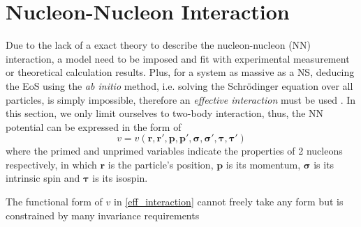 \section{Nucleon-Nucleon Interaction}%
\label{sec:nucleon_nucleon_interaction}

Due to the lack of a exact theory to describe the nucleon-nucleon (\gls{NN}) interaction, a model need to be imposed and fit with experimental measurement or theoretical calculation results. Plus, for a system as massive as a \gls{NS}, deducing the \gls{EoS} using the \emph{ab initio} method, i.e. solving the Schr\"{o}dinger equation over all particles, is simply impossible, therefore an \emph{effective interaction} must be used \cite{greiner1996nuclear}. In this section, we only limit ourselves to two-body interaction, thus, the \gls{NN} potential can be expressed in the form of
\begin{equation}
        v = v(\bm{r}, \bm{r'}, \bm{p}, \bm{p'}, \bm{\sigma}, \bm{\sigma'}, \bm{\tau}, \bm{\tau'})
        \label{eff_interaction}
\end{equation}
where the primed and unprimed variables indicate the properties of 2 nucleons respectively, in which $\bm{r}$ is the particle's position, $\bm{p}$ is its momentum, $\bm{\sigma}$ is its intrinsic spin and $\bm{\tau}$ is its isospin.\par
The functional form of $v$ in \eqref{eff_interaction} cannot freely take any form but is constrained by many invariance requirements \cite{greiner1996nuclear}
